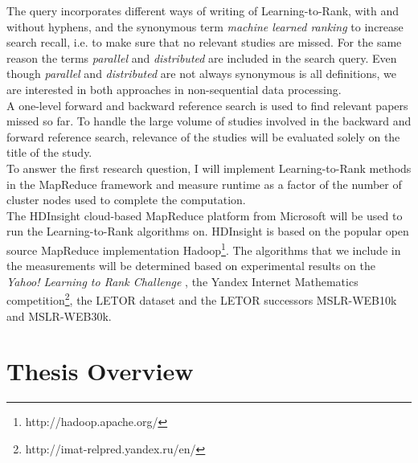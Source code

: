 The query incorporates different ways of writing of Learning-to-Rank, with and without hyphens, and the synonymous term \emph{machine learned ranking} to increase search recall, i.e. to make sure that no relevant studies are missed. For the same reason the terms \emph{parallel} and \emph{distributed} are included in the search query. Even though \emph{parallel} and \emph{distributed} are not always synonymous is all definitions, we are interested in both approaches in non-sequential data processing.\\

A one-level forward and backward reference search is used to find relevant papers missed so far. To handle the large volume of studies involved in the backward and forward reference search, relevance of the studies will be evaluated solely on the title of the study.\\

To answer the first research question, I will implement Learning-to-Rank methods in the MapReduce framework and measure runtime as a factor of the number of cluster nodes used to complete the computation.\\

The HDInsight cloud-based MapReduce platform from Microsoft will be used to run the Learning-to-Rank algorithms on. HDInsight is based on the popular open source MapReduce implementation Hadoop\footnote{http://hadoop.apache.org/}.
The algorithms that we include in the measurements will be determined based on experimental results on the \emph{Yahoo! Learning to Rank Challenge} \cite{Chapelle2011a}, the Yandex Internet Mathematics competition\footnote{http://imat-relpred.yandex.ru/en/}, the LETOR \cite{Qin2010} dataset and the LETOR successors MSLR-WEB10k and MSLR-WEB30k.

\section{Thesis Overview}


